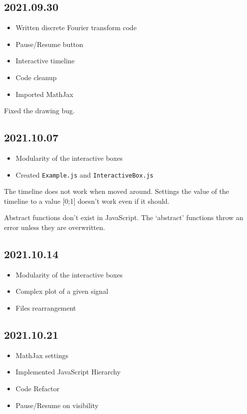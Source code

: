 \documentclass{article}
\begin{document}
\subsection*{2021.09.30}

\begin{itemize}
    \item Written discrete Fourier transform code
    \item Pause/Resume button
    \item Interactive timeline
    \item Code cleanup
    \item Imported MathJax
\end{itemize}

Fixed the drawing bug.

\subsection*{2021.10.07}

\begin{itemize}
    \item Modularity of the interactive boxes
    \item Created \texttt{Example.js} and \texttt{InteractiveBox.js}
\end{itemize}

The timeline does not work when moved around.
Settings the value of the timeline to a value [0;1]
doesn't work even if it should.

Abstract functions don't exist in JavaScript.
The `abstract' functions throw an error unless they are overwritten.

\subsection*{2021.10.14}

\begin{itemize}
    \item Modularity of the interactive boxes
    \item Complex plot of a given signal
    \item Files rearrangement
\end{itemize}

\subsection*{2021.10.21}

\begin{itemize}
    \item MathJax settings
    \item Implemented JavaScript Hierarchy
    \item Code Refactor
    \item Pause/Resume on visibility
\end{itemize}
\end{document}

